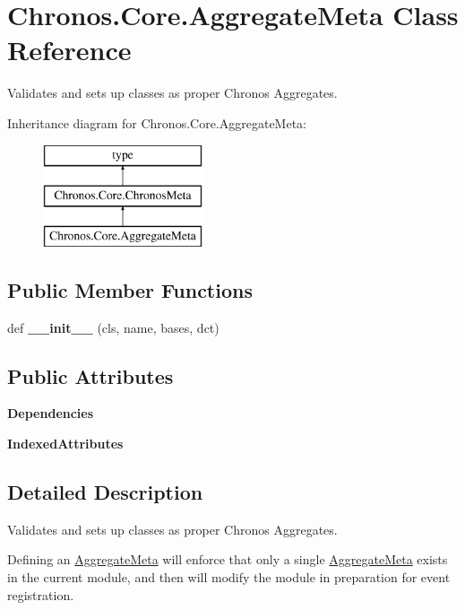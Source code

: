 \hypertarget{classChronos_1_1Core_1_1AggregateMeta}{}\section{Chronos.\+Core.\+Aggregate\+Meta Class Reference}
\label{classChronos_1_1Core_1_1AggregateMeta}


Validates and sets up classes as proper Chronos Aggregates.  


Inheritance diagram for Chronos.\+Core.\+Aggregate\+Meta\+:\begin{figure}[H]
\begin{center}
\leavevmode
\includegraphics[height=3.000000cm]{classChronos_1_1Core_1_1AggregateMeta}
\end{center}
\end{figure}
\subsection*{Public Member Functions}
\begin{DoxyCompactItemize}
\item 
def {\bfseries \+\_\+\+\_\+init\+\_\+\+\_\+} (cls, name, bases, dct)
\end{DoxyCompactItemize}
\subsection*{Public Attributes}
\begin{DoxyCompactItemize}
\item 
{\bfseries Dependencies}
\item 
{\bfseries Indexed\+Attributes}
\end{DoxyCompactItemize}


\subsection{Detailed Description}
Validates and sets up classes as proper Chronos Aggregates. 

Defining an \hyperlink{classChronos_1_1Core_1_1AggregateMeta}{Aggregate\+Meta} will enforce that only a single \hyperlink{classChronos_1_1Core_1_1AggregateMeta}{Aggregate\+Meta} exists in the current module, and then will modify the module in preparation for event registration.

